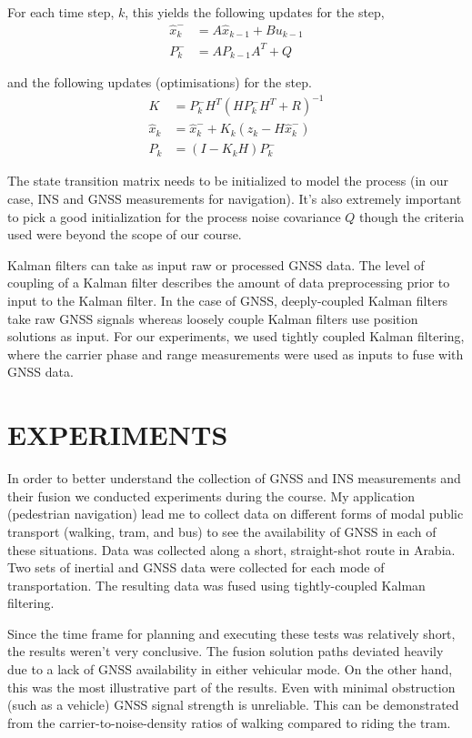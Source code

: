 \documentclass[twoside]{article}
\begin{document}
For each time step, $k$, this yields the following updates for the  step,
\begin{align*}
    \hat{x}_k^- &=  A\hat{x}_{k - 1} + Bu_{k - 1} \\
    P_k^- &= AP_{k - 1}A^T + Q
\end{align*}

and the following updates (optimisations) for the  step.
\begin{align*}
    K &= P_k^-H^T(HP_k^-H^T + R)^{-1}\\
    \hat{x}_k &= \hat{x}_k^- + K_k(z_k - H \hat{x}_k^-)\\
    P_k &= (I - K_kH)P_k^{-}
\end{align*}

The state transition matrix needs to be initialized to model the process (in our case, INS and GNSS
measurements for navigation). It's also extremely important to pick a good initialization for the process
noise covariance $Q$ though the criteria used were beyond the scope of our course.

Kalman filters can take as input raw or processed GNSS data. The level of coupling of a Kalman filter
describes the amount of data preprocessing prior to input to the Kalman filter. In the case of GNSS,
deeply-coupled Kalman filters take raw GNSS signals whereas loosely couple Kalman filters use position
solutions as input. For our experiments, we used tightly coupled Kalman filtering, where the carrier
phase and range measurements were used as inputs to fuse with GNSS data.
\section{EXPERIMENTS}
In order to better understand the collection of GNSS and INS measurements and their fusion we conducted
experiments during the course. My application (pedestrian navigation) lead me to collect data on different
forms of modal public transport (walking, tram, and bus) to see the availability of GNSS in each of these
situations. Data was collected along a short, straight-shot route in Arabia. Two sets of inertial and
GNSS data were collected for each mode of transportation. The resulting data was fused using tightly-coupled
Kalman filtering.

Since the time frame for planning and executing these tests was relatively short, the results weren't very
conclusive. The fusion solution paths deviated heavily due to a lack of GNSS availability in either vehicular
mode. On the other hand, this was the most illustrative part of the results. Even with minimal obstruction
(such as a vehicle) GNSS signal strength is unreliable. This can be demonstrated from the
carrier-to-noise-density ratios of walking compared to riding the tram.
\end{document}
